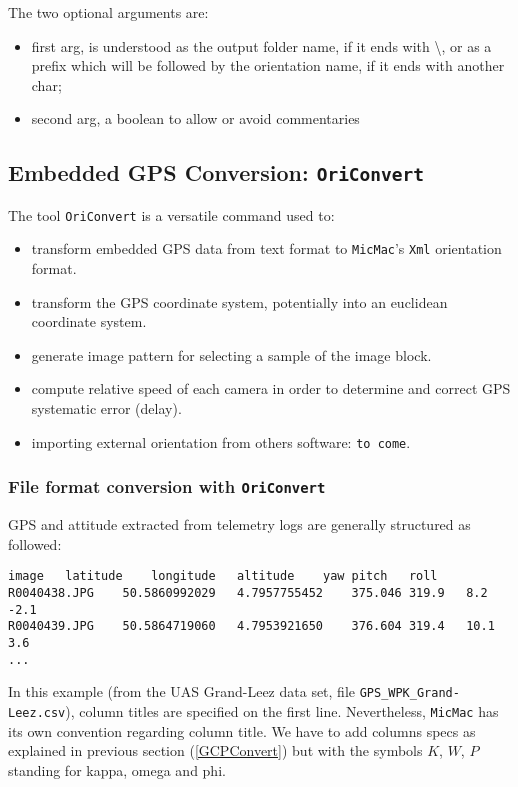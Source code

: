 \vspace{\baselineskip}
The two optional arguments are:
\begin{itemize}
    \item first arg, is understood as the output folder name, if it ends with \textbackslash, or as a prefix which will be followed by the orientation name, if it ends with another char;
    \item second arg, a boolean to allow or avoid commentaries
\end{itemize}

\subsection{Embedded GPS Conversion: {\tt OriConvert}}\label{OriConvert}

The tool {\tt OriConvert} is a versatile command used to:
\begin{itemize}
\item transform embedded GPS data from text format to {\tt MicMac}'s {\tt Xml} orientation format. 
\item transform the GPS coordinate system, potentially into an euclidean coordinate system.
\item generate image pattern for selecting a sample of the image block.
\item compute relative speed of each camera in order to determine and correct GPS systematic error (delay).
\item importing external orientation from others software: {\tt to come}. 
\end{itemize}

\subsubsection{File format conversion with {\tt OriConvert}}

GPS and attitude extracted from telemetry logs are generally structured as followed:

\begin{verbatim}
image	latitude	longitude	altitude	yaw	pitch	roll
R0040438.JPG	50.5860992029	4.7957755452	375.046	319.9	8.2	-2.1
R0040439.JPG	50.5864719060	4.7953921650	376.604	319.4	10.1	3.6
...
\end{verbatim}


In this example (from the UAS Grand-Leez data set, file {\tt GPS\_WPK\_Grand-Leez.csv}), column titles are specified on the first line. Nevertheless, {\tt MicMac} has its own convention regarding column title. We have to add columns specs as explained in previous section (\ref{GCPConvert}) but with the symbols $K$, $W$, $P$ standing for kappa, omega and phi. 

